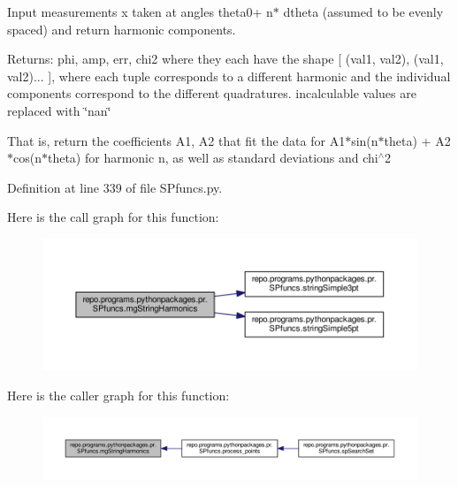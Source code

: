Input measurements x taken at angles theta0+ n$\ast$ dtheta (assumed to be evenly spaced) and return harmonic components. 

Returns\-: phi, amp, err, chi2 where they each have the shape \mbox{[} (val1, val2), (val1, val2)... \mbox{]}, where each tuple corresponds to a different harmonic and the individual components correspond to the different quadratures. incalculable values are replaced with \char`\"{}nan\char`\"{}

That is, return the coefficients A1, A2 that fit the data for A1$\ast$sin(n$\ast$theta) + A2$\ast$cos(n$\ast$theta) for harmonic n, as well as standard deviations and chi$^\wedge$2 

Definition at line 339 of file S\-Pfuncs.\-py.



Here is the call graph for this function\-:
\nopagebreak
\begin{figure}[H]
\begin{center}
\leavevmode
\includegraphics[width=350pt]{namespacerepo_1_1programs_1_1pythonpackages_1_1pr_1_1SPfuncs_a154be474c56db17750f8232efe410d54_cgraph}
\end{center}
\end{figure}




Here is the caller graph for this function\-:
\nopagebreak
\begin{figure}[H]
\begin{center}
\leavevmode
\includegraphics[width=350pt]{namespacerepo_1_1programs_1_1pythonpackages_1_1pr_1_1SPfuncs_a154be474c56db17750f8232efe410d54_icgraph}
\end{center}
\end{figure}


